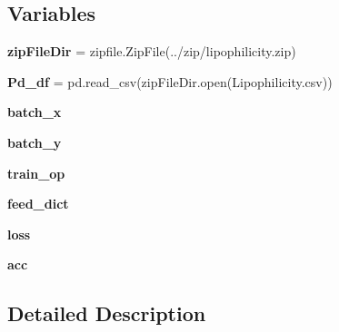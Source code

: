 \subsection*{Variables}
\begin{DoxyCompactItemize}
\item 
\mbox{\label{namespacechemistry2quant_1_1chem2quant__lipophilicity_a71b15fb108d9044fcedeb23bd1b6c85f}} 
{\bfseries zip\+File\+Dir} = zipfile.\+Zip\+File(\textquotesingle{}../zip/lipophilicity.\+zip\textquotesingle{})
\item 
\mbox{\label{namespacechemistry2quant_1_1chem2quant__lipophilicity_a7147214fc95c63ac8973e5029561b931}} 
{\bfseries Pd\+\_\+df} = pd.\+read\+\_\+csv(zip\+File\+Dir.\+open(\textquotesingle{}Lipophilicity.\+csv\textquotesingle{}))
\item 
\mbox{\label{namespacechemistry2quant_1_1chem2quant__lipophilicity_a3088c63f3c0976945edeec5ee068117f}} 
{\bfseries batch\+\_\+x}
\item 
\mbox{\label{namespacechemistry2quant_1_1chem2quant__lipophilicity_a8cebae2fba412595caf977e5916c44c8}} 
{\bfseries batch\+\_\+y}
\item 
\mbox{\label{namespacechemistry2quant_1_1chem2quant__lipophilicity_a09c48f7917229c48ec00c846b58c1d95}} 
{\bfseries train\+\_\+op}
\item 
\mbox{\label{namespacechemistry2quant_1_1chem2quant__lipophilicity_a7475a4cf525738bc1b787767a50de969}} 
{\bfseries feed\+\_\+dict}
\item 
\mbox{\label{namespacechemistry2quant_1_1chem2quant__lipophilicity_af186d229e2c07852c9e86571e7f6a9bb}} 
{\bfseries loss}
\item 
\mbox{\label{namespacechemistry2quant_1_1chem2quant__lipophilicity_a380004285ce55e7904555491af03d96e}} 
{\bfseries acc}
\end{DoxyCompactItemize}


\subsection{Detailed Description}
\begin{DoxyVerb}\end{DoxyVerb}
 